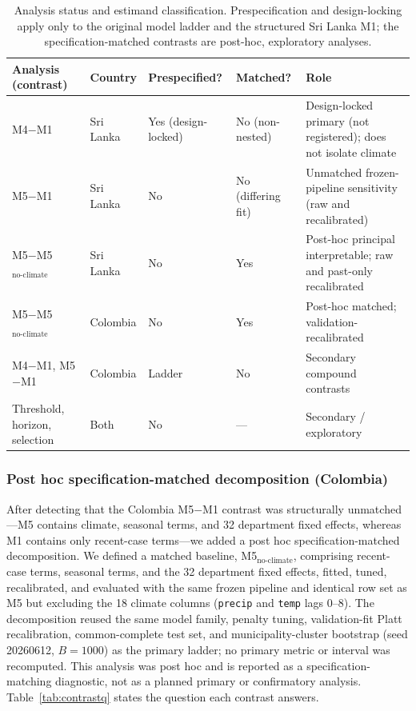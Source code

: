 \documentclass[11pt,a4paper]{article}
\begin{document}
\begin{table}[htbp]
\centering
\caption{Analysis status and estimand classification. Prespecification and design-locking apply only to the original model ladder and the structured Sri Lanka M1; the specification-matched contrasts are post-hoc, exploratory analyses.}
\label{tab:analysisstatus}
\footnotesize{}
\begin{tabular}{@{}p{3.1cm}llll@{}}
\toprule
Analysis (contrast) & Country & Prespecified? & Matched? & Role \\
\midrule
M4$-$M1 & Sri Lanka & Yes (design-locked) & No (non-nested) & Design-locked primary (not registered); does not isolate climate \\
M5$-$M1 & Sri Lanka & No & No (differing fit) & Unmatched frozen-pipeline sensitivity (raw and recalibrated) \\
M5$-$M5$_{\text{no-climate}}$ & Sri Lanka & No & Yes & Post-hoc principal interpretable; raw and past-only recalibrated \\
M5$-$M5$_{\text{no-climate}}$ & Colombia & No & Yes & Post-hoc matched; validation-recalibrated \\
M4$-$M1, M5$-$M1 & Colombia & Ladder & No & Secondary compound contrasts \\
Threshold, horizon, selection & Both & No & --- & Secondary / exploratory \\
\bottomrule
\end{tabular}
\end{table}

\subsubsection*{Post hoc specification-matched decomposition (Colombia)}
After detecting that the Colombia M5$-$M1 contrast was structurally unmatched---M5 contains climate, seasonal terms, and 32 department fixed effects, whereas M1 contains only recent-case terms---we added a post hoc specification-matched decomposition. We defined a matched baseline, M5$_{\text{no-climate}}$, comprising recent-case terms, seasonal terms, and the 32 department fixed effects, fitted, tuned, recalibrated, and evaluated with the same frozen pipeline and identical row set as M5 but excluding the 18 climate columns (\texttt{precip} and \texttt{temp} lags 0--8). The decomposition reused the same model family, penalty tuning, validation-fit Platt recalibration, common-complete test set, and municipality-cluster bootstrap (seed 20260612, $B=1000$) as the primary ladder; no primary metric or interval was recomputed. This analysis was post hoc and is reported as a specification-matching diagnostic, not as a planned primary or confirmatory analysis. Table~\ref{tab:contrastq} states the question each contrast answers.
\end{document}
